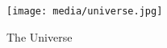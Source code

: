 \lipsum[2-2]

\begin{figure}[h!]
  \centering
  \texttt{[image: media/universe.jpg]}
  \caption{The Universe}
  \label{fig:universe}
\end{figure}

\lipsum[5-5]
